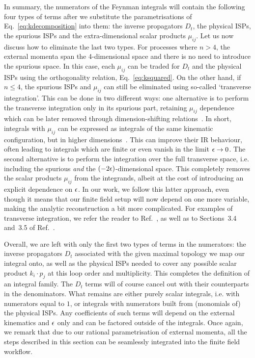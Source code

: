 \documentclass[main.tex]{subfiles}
\begin{document}
In summary, the numerators of the Feynman integrals will contain the following four types of terms after we substitute the parametrisations of Eq.~\ref{eq:kdecomposition} into them: the inverse propagators $D_t$, the physical ISPs, the spurious ISPs and the extra-dimensional scalar products $\mu_{ij}$.  Let us now discuss how to eliminate the last two types. For processes where $n>4$, the external momenta span the 4-dimensional space and there is no need to introduce the spurious space. In this case, each $\mu_{ij}$ can be traded for $D_t$ and the physical ISPs using the orthogonality relation, Eq.~\ref{eq:ksquared}. On the other hand, if $n\le4$, the spurious ISPs and $\mu_{ij}$ can still be eliminated using so-called `transverse integration'. This can be done in two different ways: one alternative is to perform the transverse integration only in its spurious part, retaining $\mu_{ij}$ dependence which can be later removed through dimension-shifting relations~\cite{badger:2017jhb}. In short, integrals with $\mu_{ij}$ can be expressed as integrals of the same kinematic configuration, but in higher dimensions~\cite{Bern:1995db}. This can improve their IR behaviour, often leading to integrals which are finite or even vanish in the limit $\epsilon \to 0$. The second alternative is to perform the integration over the full transverse space, i.e. including the spurious \textit{and} the $(-2\epsilon)$-dimensional space. This completely removes the scalar products $\mu_{ij}$ from the integrands, albeit at the cost of introducing an explicit dependence on $\epsilon$. In our work, we follow this latter approach, even though it means that our finite field setup will now depend on one more variable, making the analytic reconstruction a bit more complicated. For examples of transverse integration, we refer the reader to Ref.~\cite{Mastrolia:2016dhn}, as well as to Sections~3.4 and~3.5 of Ref.~\cite{Badger:2023eqz}.

Overall, we are left with only the first two types of terms in the numerators: the inverse propagators $D_t$ associated with the given maximal topology we map our integral onto, as well as the physical ISPs needed to cover any possible scalar product $k_i \cdot p_j$ at this loop order and multiplicity. This completes the definition of an integral family. The $D_t$ terms will of course cancel out with their counterparts in the denominators. What remains are either purely scalar integrals, i.e. with numerators equal to $1$, or integrals with numerators built from (monomials of) the physical ISPs. Any coefficients of such terms will depend on the external kinematics and $\epsilon$ only and can be factored outside of the integrals. Once again, we remark that due to our rational parametrisation of external momenta, all the steps described in this section can be seamlessly integrated into the finite field workflow.
\end{document}
